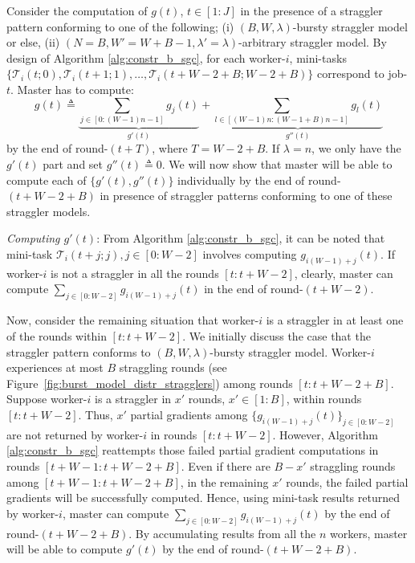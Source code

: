 Consider the computation of $g(t)$, $t\in[1:J]$ in the presence of a straggler pattern conforming to one of the following; (i) $(B,W,\lambda)$-bursty straggler model or else, (ii) $(N=B,W'=W+B-1,\lambda'=\lambda)$-arbitrary straggler model. By design of Algorithm \ref{alg:constr_b_sgc}, for each worker-$i$, mini-tasks $\{\mathcal{T}_i(t;0),\mathcal{T}_i(t+1;1),\ldots,\mathcal{T}_i(t+W-2+B;W-2+B)\}$ correspond to job-$t$. Master has to compute:
\begin{equation*}
g(t)\triangleq \underbrace{\sum_{j\in[0:(W-1)n-1]}g_{j}(t)}_{g'(t)}+\underbrace{\sum_{l\in[(W-1)n:(W-1+B)n-1]}g_{l}(t)}_{g''(t)}
\end{equation*}
by the end of round-$(t+T)$, where $T= W-2+B$. If $\lambda=n$, we only have the $g'(t)$ part and set $g''(t)\triangleq 0$. We will now show that master will be able to compute each of $\{g'(t),g''(t)\}$ individually by the end of round-$(t+W-2+B)$ in presence of straggler patterns conforming to one of these straggler models. 

\textit{Computing $g'(t)$}: From Algorithm \ref{alg:constr_b_sgc}, it can be noted that mini-task $\mathcal{T}_i(t+j;j), j\in[0:W-2]$ involves computing $g_{i(W-1)+j}(t)$. If worker-$i$ is not a straggler in all the rounds $[t:t+W-2]$, clearly, master can compute $\sum_{j\in [0:W-2]}g_{i(W-1)+j}(t)$ in the end of round-$(t+W-2)$.

Now, consider the remaining situation that worker-$i$ is a straggler in at least one of the rounds within $[t:t+W-2]$. We initially discuss the case that the straggler pattern conforms to $(B,W,\lambda)$-bursty straggler model. Worker-$i$ experiences at most $B$ straggling rounds (see Figure~\ref{fig:burst_model_distr_stragglers}) among rounds $[t:t+W-2+B]$. Suppose worker-$i$ is a straggler in $x'$ rounds, $x'\in[1:B]$, within rounds $[t:t+W-2]$. Thus, $x'$ partial gradients among $\{g_{i(W-1)+j}(t)\}_{j\in[0:W-2]}$ are not returned by worker-$i$ in rounds $[t:t+W-2]$. However, Algorithm \ref{alg:constr_b_sgc} reattempts those failed partial gradient computations in rounds $[t+W-1:t+W-2+B]$. Even if there are $B-x'$ straggling rounds among $[t+W-1:t+W-2+B]$, in the remaining $x'$ rounds, the failed partial gradients will be successfully computed. Hence, using mini-task results returned by worker-$i$, master can compute $\sum_{j\in [0:W-2]}g_{i(W-1)+j}(t)$ by the end of round-$(t+W-2+B)$. By accumulating results from all the $n$ workers, master will be able to compute $g'(t)$ by the end of round-$(t+W-2+B)$.


